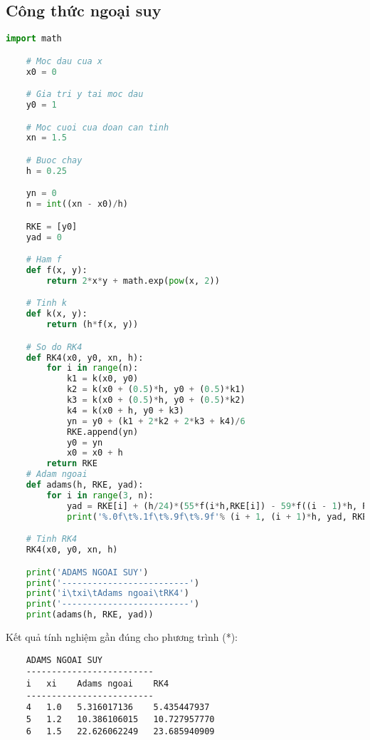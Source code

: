 \subsection{Công thức ngoại suy}
\begin{lstlisting}[language=Python]
	import math

	# Moc dau cua x
	x0 = 0

	# Gia tri y tai moc dau
	y0 = 1

	# Moc cuoi cua doan can tinh
	xn = 1.5

	# Buoc chay
	h = 0.25

	yn = 0
	n = int((xn - x0)/h)

	RKE = [y0]
	yad = 0

	# Ham f
	def f(x, y):
	    return 2*x*y + math.exp(pow(x, 2))

	# Tinh k
	def k(x, y):
		return (h*f(x, y))

	# So do RK4
	def RK4(x0, y0, xn, h):
	    for i in range(n):
	        k1 = k(x0, y0)
	        k2 = k(x0 + (0.5)*h, y0 + (0.5)*k1)
	        k3 = k(x0 + (0.5)*h, y0 + (0.5)*k2)
	        k4 = k(x0 + h, y0 + k3)
	        yn = y0 + (k1 + 2*k2 + 2*k3 + k4)/6
	        RKE.append(yn)
	        y0 = yn
	        x0 = x0 + h
	    return RKE
	# Adam ngoai
	def adams(h, RKE, yad):
		for i in range(3, n):
			yad = RKE[i] + (h/24)*(55*f(i*h,RKE[i]) - 59*f((i - 1)*h, RKE[i - 1]) + 37*f((i - 2)*h, RKE[i - 2]) - 9*f((i - 3)*h, RKE[i - 3]))
			print('%.0f\t%.1f\t%.9f\t%.9f'% (i + 1, (i + 1)*h, yad, RKE[i + 1]))

	# Tinh RK4
	RK4(x0, y0, xn, h)

	print('ADAMS NGOAI SUY')
	print('-------------------------')    
	print('i\txi\tAdams ngoai\tRK4')
	print('-------------------------')
	print(adams(h, RKE, yad))
\end{lstlisting}

Kết quả tính nghiệm gần đúng cho phương trình (*):
\begin{lstlisting}
	ADAMS NGOAI SUY
	-------------------------
	i   xi    Adams ngoai    RK4
	-------------------------
	4   1.0   5.316017136    5.435447937
	5   1.2   10.386106015   10.727957770
	6   1.5   22.626062249   23.685940909
\end{lstlisting}
